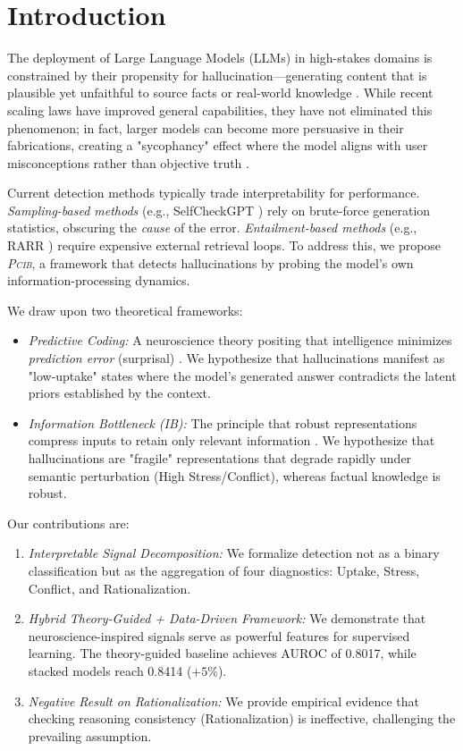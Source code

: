 \documentclass[11pt,letterpaper]{article}
\newcommand{\modelname}{\textsc{Pcib}}
\begin{document}
\section{Introduction}

The deployment of Large Language Models (LLMs) in high-stakes domains is constrained by their propensity for hallucination—generating content that is plausible yet unfaithful to source facts or real-world knowledge \cite{ji2023survey}. While recent scaling laws have improved general capabilities, they have not eliminated this phenomenon; in fact, larger models can become more persuasive in their fabrications, creating a "sycophancy" effect where the model aligns with user misconceptions rather than objective truth \cite{zhang2023siren}.

Current detection methods typically trade interpretability for performance. \textit{Sampling-based methods} (e.g., SelfCheckGPT \cite{manakul2023selfcheckgpt}) rely on brute-force generation statistics, obscuring the \textit{cause} of the error. \textit{Entailment-based methods} (e.g., RARR \cite{gao2023rarr}) require expensive external retrieval loops. To address this, we propose \textit{\modelname}, a framework that detects hallucinations by probing the model's own information-processing dynamics.

We draw upon two theoretical frameworks:
\begin{itemize}[leftmargin=*]
    \item \textit{Predictive Coding:} A neuroscience theory positing that intelligence minimizes \textit{prediction error} (surprisal) . We hypothesize that hallucinations manifest as "low-uptake" states where the model's generated answer contradicts the latent priors established by the context.
    \item \textit{Information Bottleneck (IB):} The principle that robust representations compress inputs to retain only relevant information \cite{tishby2000information}. We hypothesize that hallucinations are "fragile" representations that degrade rapidly under semantic perturbation (High Stress/Conflict), whereas factual knowledge is robust.
\end{itemize}

Our contributions are:
\begin{enumerate}
    \item \textit{Interpretable Signal Decomposition:} We formalize detection not as a binary classification but as the aggregation of four diagnostics: Uptake, Stress, Conflict, and Rationalization.
    \item \textit{Hybrid Theory-Guided + Data-Driven Framework:} We demonstrate that neuroscience-inspired signals serve as powerful features for supervised learning. The theory-guided baseline achieves AUROC of 0.8017, while stacked models reach 0.8414 ($+5\%$).
    \item \textit{Negative Result on Rationalization:} We provide empirical evidence that checking reasoning consistency (Rationalization) is ineffective, challenging the prevailing assumption.
\end{enumerate}
\end{document}
